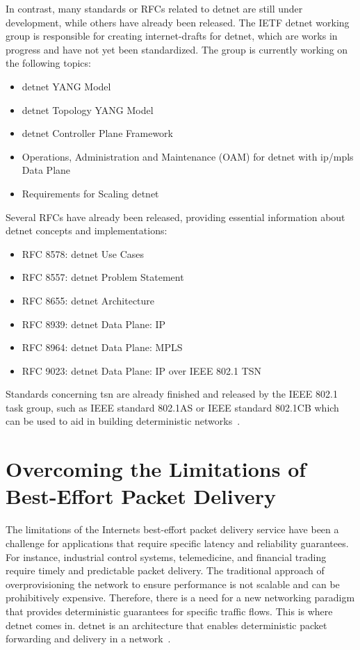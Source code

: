 \documentclass[runningheads]{llncs}
\begin{document}
In contrast, many standards or RFCs related to \gls{detnet} are still under development, while others have already been released. The IETF \gls{detnet} working group is responsible for creating internet-drafts for \gls{detnet}, which are works in progress and have not yet been standardized. The group is currently working on the following topics:

\begin{itemize}
  \item \gls{detnet} YANG Model
  \item \gls{detnet} Topology YANG Model
  \item \gls{detnet} Controller Plane Framework
  \item Operations, Administration and Maintenance (OAM) for \gls{detnet} with \gls{ip}/\gls{mpls} Data Plane
  \item Requirements for Scaling \gls{detnet}
\end{itemize}

Several RFCs have already been released, providing essential information about \gls{detnet} concepts and implementations:

\begin{itemize}
  \item RFC 8578: \gls{detnet} Use Cases~\cite{rfc8578}
  \item RFC 8557: \gls{detnet} Problem Statement~\cite{rfc8557}
  \item RFC 8655: \gls{detnet} Architecture~\cite{rfc8655}
  \item RFC 8939: \gls{detnet} Data Plane: IP~\cite{rfc8939}
  \item RFC 8964: \gls{detnet} Data Plane: MPLS~\cite{rfc8964}
  \item RFC 9023: \gls{detnet} Data Plane: IP over IEEE 802.1 TSN~\cite{rfc9023}
\end{itemize}

Standards concerning \gls{tsn} are already finished and released by the IEEE 802.1 task group, such as IEEE standard 802.1AS or IEEE standard 802.1CB which can be used to aid in building deterministic networks~\cite{Finn2018}.

\section{Overcoming the Limitations of Best-Effort Packet Delivery}

The limitations of the Internets best-effort packet delivery service have been a challenge for applications that require specific latency and reliability guarantees. For instance, industrial control systems, telemedicine, and financial trading require timely and predictable packet delivery. The traditional approach of overprovisioning the network to ensure performance is not scalable and can be prohibitively expensive. Therefore, there is a need for a new networking paradigm that provides deterministic guarantees for specific traffic flows. This is where \gls{detnet} comes in. \gls{detnet} is an architecture that enables deterministic packet forwarding and delivery in a network~\cite{Finn2018}.
\end{document}
